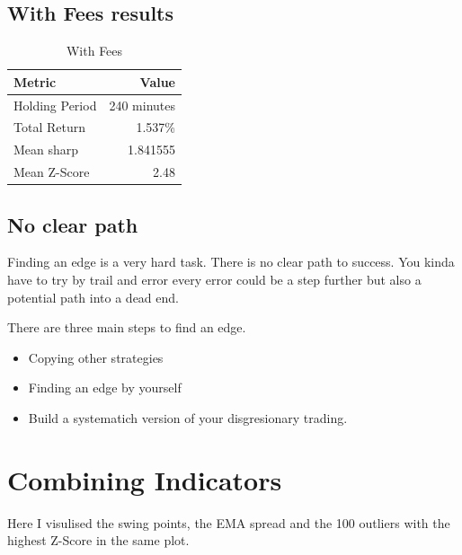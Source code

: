 \documentclass[12pt]{article}
\begin{document}
\subsection{With Fees results}


\begin{table}[H]
  \centering
  \caption{With Fees}
  \label{tab:backtest_results_fees}
  \begin{tabular}{@{}lr@{}}
    \toprule
    Metric & Value \\
    \midrule
    Holding Period & 240 minutes \\
    Total Return & 1.537\% \\
    Mean sharp & 1.841555 \\
    Mean Z-Score & 2.48 \\

    \bottomrule
  \end{tabular}
\end{table}








\subsection{No clear path}
Finding an edge is a very hard task. There is no clear path to success. You kinda have to try by trail and error every error could be a step further but also a potential path into a dead end.
  



There are three main steps to find an edge. 
\begin{itemize}
  \item Copying other strategies
  \item Finding an edge by yourself
  \item Build a systematich version of your disgresionary trading.
\end{itemize}






















\newpage
\section{Combining Indicators}
Here I visulised the swing points, the EMA spread and the 100 outliers with the highest Z-Score in the same plot.
\end{document}
